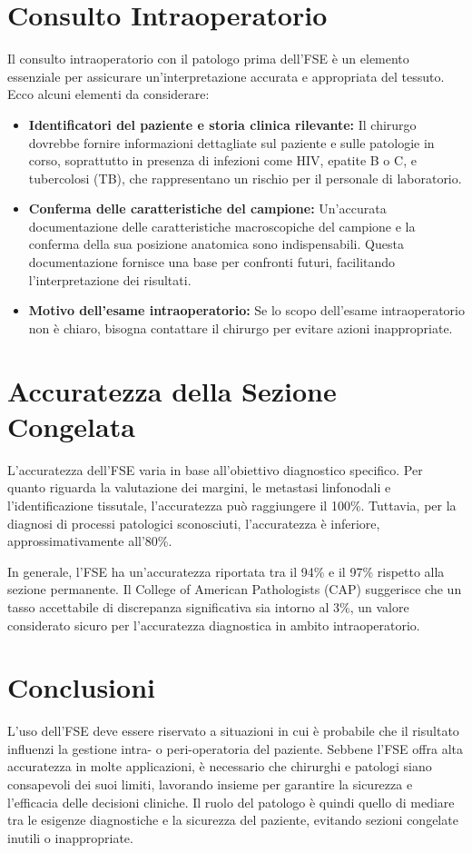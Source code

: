 \section{Consulto Intraoperatorio}
Il consulto intraoperatorio con il patologo prima dell'FSE è un elemento essenziale per assicurare un’interpretazione accurata e appropriata del tessuto. Ecco alcuni elementi da considerare:

\begin{itemize}
    \item \textbf{Identificatori del paziente e storia clinica rilevante:} Il chirurgo dovrebbe fornire informazioni dettagliate sul paziente e sulle patologie in corso, soprattutto in presenza di infezioni come HIV, epatite B o C, e tubercolosi (TB), che rappresentano un rischio per il personale di laboratorio.
    \item \textbf{Conferma delle caratteristiche del campione:} Un’accurata documentazione delle caratteristiche macroscopiche del campione e la conferma della sua posizione anatomica sono indispensabili. Questa documentazione fornisce una base per confronti futuri, facilitando l'interpretazione dei risultati.
    \item \textbf{Motivo dell'esame intraoperatorio:} Se lo scopo dell'esame intraoperatorio non è chiaro, bisogna contattare il chirurgo per evitare azioni inappropriate.
\end{itemize}

\section{Accuratezza della Sezione Congelata}
L'accuratezza dell'FSE varia in base all'obiettivo diagnostico specifico. Per quanto riguarda la valutazione dei margini, le metastasi linfonodali e l’identificazione tissutale, l'accuratezza può raggiungere il 100\%. Tuttavia, per la diagnosi di processi patologici sconosciuti, l'accuratezza è inferiore, approssimativamente all'80\%.

In generale, l'FSE ha un’accuratezza riportata tra il 94\% e il 97\% rispetto alla sezione permanente. Il College of American Pathologists (CAP) suggerisce che un tasso accettabile di discrepanza significativa sia intorno al 3\%, un valore considerato sicuro per l'accuratezza diagnostica in ambito intraoperatorio.

\section{Conclusioni}
L'uso dell'FSE deve essere riservato a situazioni in cui è probabile che il risultato influenzi la gestione intra- o peri-operatoria del paziente. Sebbene l'FSE offra alta accuratezza in molte applicazioni, è necessario che chirurghi e patologi siano consapevoli dei suoi limiti, lavorando insieme per garantire la sicurezza e l’efficacia delle decisioni cliniche. Il ruolo del patologo è quindi quello di mediare tra le esigenze diagnostiche e la sicurezza del paziente, evitando sezioni congelate inutili o inappropriate.
